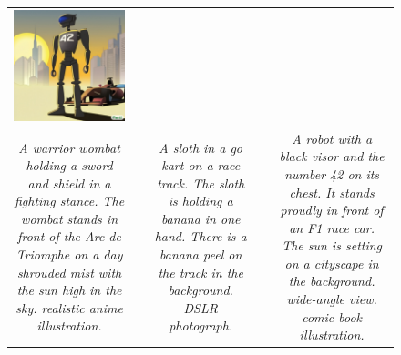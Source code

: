 \begin{figure}[ht!]
\begin{adjustwidth}{-0.8in}{-0.5in}
\begin{tabular}{cccccccccccccccccccc}
\multicolumn{6}{c}{\includegraphics[width=\thirdcolwidth\textwidth]{figures/cherries/robot_driver.jpg}} \\
\multicolumn{6}{p{\thirdcolwidth\textwidth}}{\textit{\tiny A warrior wombat holding a sword and shield in a fighting stance. The wombat stands in front of the Arc de Triomphe on a day shrouded mist with the sun high in the sky. realistic anime illustration.}} && 
\multicolumn{6}{p{\thirdcolwidth\textwidth}}{\textit{\tiny A sloth in a go kart on a race track. The sloth is holding a banana in one hand. There is a banana peel on the track in the background. DSLR photograph.}} && 
\multicolumn{6}{p{\thirdcolwidth\textwidth}}{\textit{\tiny A robot with a black visor and the number 42 on its chest. It stands proudly in front of an F1 race car. The sun is setting on a cityscape in the background. wide-angle view. comic book illustration.}} \\


\end{tabular}
\end{adjustwidth}
\end{figure}
